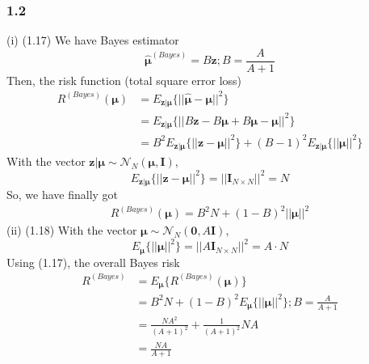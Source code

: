 \documentclass{article}\usepackage{graphicx, color}
\begin{document}
\subsubsection*{1.2}
(i) (1.17) \newline
We have Bayes estimator
\begin{displaymath}
\hat{\bm{\mu}}^{(Bayes)} = B\bm{z}; B = \frac{A}{A+1}
\end{displaymath}
Then, the risk function (total square error loss)
\begin{displaymath}
\begin{split}
R^{(Bayes)}(\bm{\mu}) &= E_{\bm{z|\mu}}\{||\hat{\bm{\mu}} - \bm{\mu}||^2\} \\
& = E_{\bm{z|\mu}}\{||B\bm{z} - B\bm{\mu} + B\bm{\mu} - \bm{\mu}||^2\} \\
& = B^2 E_{\bm{z|\mu}}\{||\bm{z} - \bm{\mu}||^2\} + (B-1)^2E_{\bm{z|\mu}}\{||\bm{\mu}||^2\}
\end{split}
\end{displaymath}
With the vector $\bm{z|\mu} \sim \mathcal{N}_N(\bm{\mu},\bm{I})$, 
\begin{displaymath}
E_{\bm{z|\mu}}\{||\bm{z} - \bm{\mu}||^2\} = ||\bm{I}_{N\times N}||^2 = N
\end{displaymath}
So, we have finally got
\begin{displaymath}
\begin{split}
R^{(Bayes)}(\bm{\mu}) = B^2 N + (1-B)^2 ||\bm{\mu}||^2
\end{split}
\end{displaymath}
(ii) (1.18) \newline
With the vector $\bm{\mu} \sim \mathcal{N}_N(\bm{0},A\bm{I})$, 
\begin{displaymath}
E_{\bm{\mu}} \{||\bm{\mu}||^2\} = ||A\bm{I}_{N\times N}||^2 = A\cdot N
\end{displaymath}
Using (1.17), the overall Bayes risk
\begin{displaymath}
\begin{split}
R^{(Bayes)} & = E_{\bm{\mu}}\{ R^{(Bayes)}(\bm{\mu}) \} \\
& = B^2 N + (1-B)^2 E_{\bm{\mu}} \{||\bm{\mu}||^2\}; B=\frac{A}{A+1} \\
& = \frac{NA^2}{(A+1)^2} + \frac{1}{(A+1)^2} NA \\
& = \frac{NA}{A+1}
\end{split}
\end{displaymath}
\end{document}
